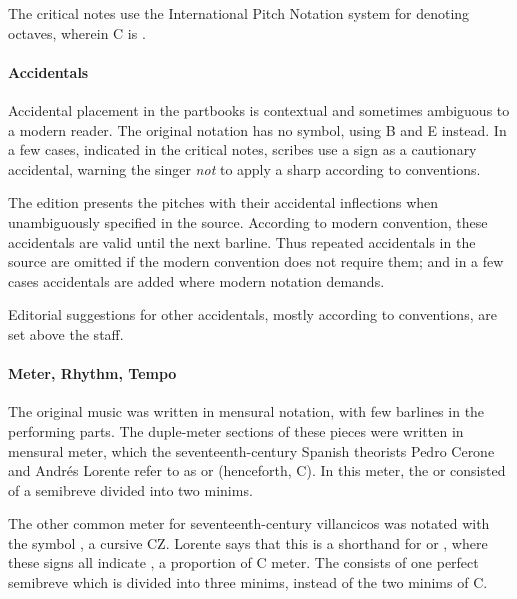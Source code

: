 The critical notes use the International Pitch Notation system for denoting octaves, wherein C is .



\paragraph{Accidentals}
Accidental placement in the partbooks is contextual and sometimes ambiguous to a modern reader.
The original notation has no \na{} symbol, using B\sh{} and E\sh{} instead.
In a few cases, indicated in the critical notes, scribes use a \sh{} sign as a cautionary accidental, warning the singer \emph{not} to apply a sharp according to  conventions.%
  \autocites{Harran:Cautionary1}{Harran:Cautionary2}

The edition presents the pitches with their accidental inflections when unambiguously specified in the source.
According to modern convention, these accidentals are valid until the next barline.
Thus repeated accidentals in the source are omitted if the modern convention does not require them; and in a few cases accidentals are added where modern notation demands.

Editorial suggestions for other accidentals, mostly according to  conventions, are set above the staff.

\paragraph{Meter, Rhythm, Tempo}
The original music was written in mensural notation, with few barlines in the performing parts. 
The duple-meter sections of these pieces were written in mensural \meterC{} meter, which the seventeenth-century Spanish theorists Pedro Cerone and Andrés Lorente refer to as  or  (henceforth, C).%
  \autocites[537]{Cerone:Melopeo}[156, 210]{Lorente:Porque}
In this meter, the  or  consisted of a semibreve divided into two minims.%
  \autocites{GonzalezValle:MusicaTexto}{GonzalezValle:CompasCabezon}

The other common meter for seventeenth-century villancicos was notated with the symbol \meterCZ{}, a cursive CZ.
Lorente says that this is a shorthand for \meterCThree{} or \meterCThreeTwo{}, where these signs all indicate , a proportion of C meter.%
  \autocite[165]{Lorente:Porque}
The  consists of one perfect semibreve which is divided into three minims, instead of the two minims of C.

